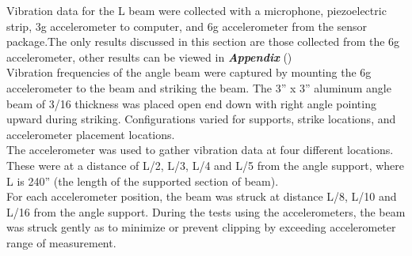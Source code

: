 %
%

\indent Vibration data for the L beam were collected with a
microphone, piezoelectric strip, 3g accelerometer to computer,
and 6g accelerometer from the sensor package.The only results
discussed in this section are those collected from the 6g
accelerometer, other results can be viewed in \textbf{\textit{Appendix}} ()\\

\indent Vibration frequencies of the angle beam were captured
by mounting the 6g accelerometer to the beam and striking the
beam. The 3” x 3” aluminum angle beam of 3/16 thickness was
placed open end down with right angle pointing upward during
striking. Configurations varied for supports, strike
locations, and accelerometer placement locations. \\
\indent The accelerometer was used to gather vibration data at
four different locations. These were at a distance of L/2,
L/3, L/4 and L/5 from the angle support, where L is 240” (the
length of the supported section of beam).\\

\indent For each accelerometer position, the beam was struck at
distance L/8, L/10 and L/16 from the angle support. During the
tests using the accelerometers, the beam was struck gently as
to minimize or prevent clipping by exceeding accelerometer
range of measurement.\\